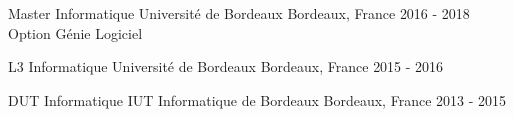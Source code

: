 \begin{cventries}
	\cventry
	{Master Informatique}
	{Université de Bordeaux}
	{Bordeaux, France}
	{2016 - 2018}
	{Option Génie Logiciel}
	
	\cventry
	{L3 Informatique}
	{Université de Bordeaux}
	{Bordeaux, France}
	{2015 - 2016}
	{}
	
	\cventry
	{DUT Informatique}
	{IUT Informatique de Bordeaux}
	{Bordeaux, France}
	{2013 - 2015}
	{}
\end{cventries}